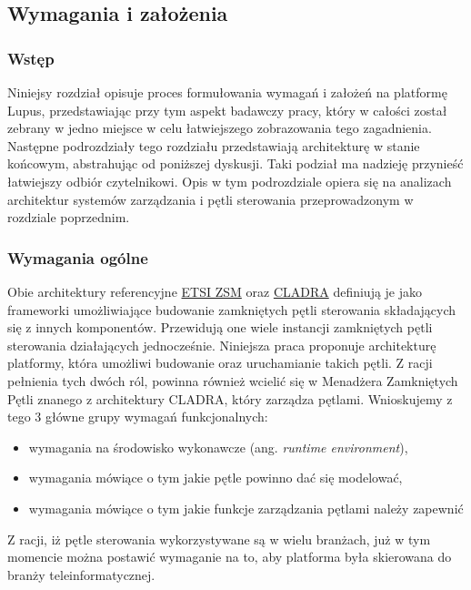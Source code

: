 \subsection{Wymagania i założenia}\label{sec:32}

\subsubsection{Wstęp}

Niniejsy rozdział opisuje proces formułowania wymagań i założeń na platformę Lupus, przedstawiając przy tym aspekt badawczy pracy, który w całości został zebrany w jedno miejsce w celu łatwiejszego zobrazowania tego zagadnienia. Następne podrozdziały tego rozdziału przedstawiają architekturę w stanie końcowym, abstrahując od poniższej dyskusji. Taki podział ma nadzieję przynieść łatwiejszy odbiór czytelnikowi. Opis w tym podrozdziale opiera się na analizach architektur systemów zarządzania i pętli sterowania przeprowadzonym w rozdziale poprzednim.

\subsubsection{Wymagania ogólne}

Obie architektury referencyjne \hyperlink{sec:zsm}{ETSI ZSM} oraz \hyperlink{sec:cladra}{CLADRA} definiują je jako frameworki umożliwiające budowanie zamkniętych pętli sterowania składających się z innych komponentów. Przewidują one wiele instancji zamkniętych pętli sterowania działających jednocześnie. Niniejsza praca proponuje architekturę platformy, która umożliwi budowanie oraz uruchamianie takich pętli. Z racji pełnienia tych dwóch ról, powinna również wcielić się w Menadżera Zamkniętych Pętli znanego z architektury CLADRA, który zarządza pętlami. Wnioskujemy z tego 3 główne grupy wymagań funkcjonalnych:
\begin{itemize}
    \item wymagania na środowisko wykonawcze (ang. \textit{runtime environment}), 
    \item wymagania mówiące o tym jakie pętle powinno dać się modelować,
    \item wymagania mówiące o tym jakie funkcje zarządzania pętlami należy zapewnić
\end{itemize}

Z racji, iż pętle sterowania wykorzystywane są w wielu branżach, już w tym momencie można postawić wymaganie na to, aby platforma była skierowana do branży teleinformatycznej. 

